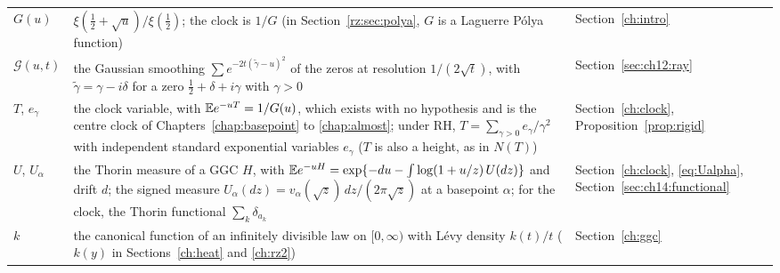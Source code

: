 {\begin{longtable}{@{}p{}p{}p{}@{}}
$G(u)$ & \raggedright $\xi(\frac12+\sqrt u)/\xi(\frac12)$; the clock is $1/G$ (in Section~\ref{rz:sec:polya}, $G$ is a Laguerre P\'olya function) & \raggedright Section~\ref{ch:intro}\tabularnewline
$\mathcal G(u,t)$ & \raggedright the Gaussian smoothing ${\sum e^{-2t(\tilde\gamma-u)^2}}$ of the zeros at resolution $1/(2\sqrt t)$, with $\tilde\gamma=\gamma-i\delta$ for a zero $\frac12+\delta+i\gamma$ with $\gamma>0$ & \raggedright Section~\ref{sec:ch12:ray}\tabularnewline
$T$, $e_\gamma$ & \raggedright the clock variable, with ${\mathbb{E} e^{-uT}=1/G(u)}$, which exists with no hypothesis and is the centre clock of Chapters~\ref{chap:basepoint} to \ref{chap:almost}; under RH, ${T=\sum_{\gamma>0}e_\gamma/\gamma^2}$ with independent standard exponential variables $e_\gamma$ ($T$ is also a height, as in $N(T)$) & \raggedright Section~\ref{ch:clock}, Proposition~\ref{prop:rigid}\tabularnewline
$U$, $U_\alpha$ & \raggedright the Thorin measure of a GGC $H$, with ${\mathbb{E} e^{-uH}=\exp\{-du-\int\log(1+u/z)\,U(dz)\}}$ and drift $d$; the signed measure ${U_\alpha(dz)=v_\alpha(\sqrt z)\,dz/(2\pi\sqrt z)}$ at a basepoint $\alpha$; for the clock, the Thorin functional $\sum_k\delta_{a_k}$ & \raggedright Section~\ref{ch:clock}, \eqref{eq:Ualpha}, Section~\ref{sec:ch14:functional}\tabularnewline
$k$ & \raggedright the canonical function of an infinitely divisible law on $[0,\infty)$ with L\'evy density $k(t)/t$ ($k(y)$ in Sections~\ref{ch:heat} and \ref{ch:rz2}) & \raggedright Section~\ref{ch:ggc}\tabularnewline
\bottomrule
\end{longtable}}

